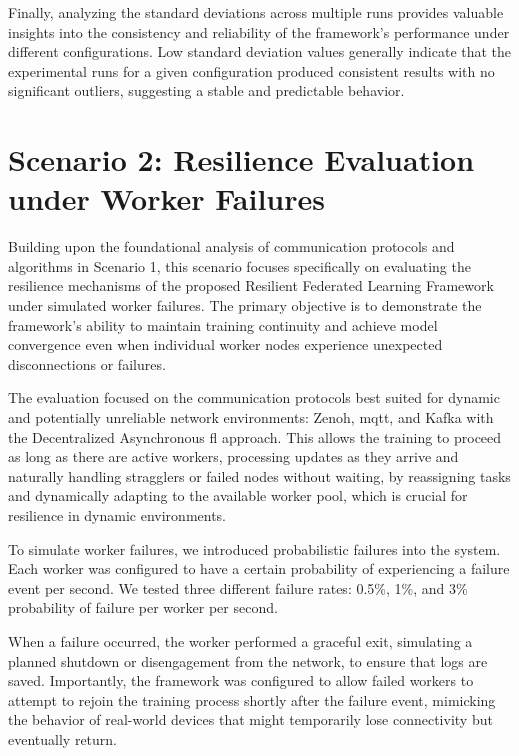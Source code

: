 Finally, analyzing the standard deviations across multiple runs provides valuable insights into the consistency and reliability of the framework's performance under different configurations. Low standard deviation values generally indicate that the experimental runs for a given configuration produced consistent results with no significant outliers, suggesting a stable and predictable behavior. 



\section{Scenario 2: Resilience Evaluation under Worker Failures}
\label{sec:scenario-2}


Building upon the foundational analysis of communication protocols and algorithms in Scenario 1, this scenario focuses specifically on evaluating the resilience mechanisms of the proposed Resilient Federated Learning Framework under simulated worker failures. The primary objective is to demonstrate the framework's ability to maintain training continuity and achieve model convergence even when individual worker nodes experience unexpected disconnections or failures.

The evaluation focused on the communication protocols best suited for dynamic and potentially unreliable network environments: Zenoh, \ac{mqtt}, and Kafka with the Decentralized Asynchronous \ac{fl} approach. This allows the training to proceed as long as there are active workers, processing updates as they arrive and naturally handling stragglers or failed nodes without waiting, by reassigning tasks and dynamically adapting to the available worker pool, which is crucial for resilience in dynamic environments.

To simulate worker failures, we introduced probabilistic failures into the system. Each worker was configured to have a certain probability of experiencing a failure event per second. We tested three different failure rates: 0.5\%, 1\%, and 3\% probability of failure per worker per second. 

When a failure occurred, the worker performed a graceful exit, simulating a planned shutdown or disengagement from the network, to ensure that logs are saved. Importantly, the framework was configured to allow failed workers to attempt to rejoin the training process shortly after the failure event, mimicking the behavior of real-world devices that might temporarily lose connectivity but eventually return.

